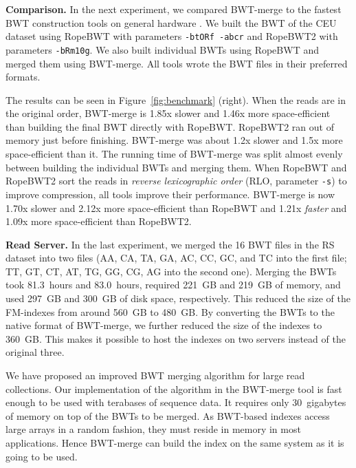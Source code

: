 \documentclass[smallabstract,smallcaptions]{dccpaper}
\newcommand{\BWT}{\textsf{BWT}}
\newcommand{\BWTmerge}{\textsf{BWT\nobreakdash-merge}}
\newcommand{\ropebwt}{\textsf{RopeBWT}}
\newcommand{\ropebwtii}{\textsf{RopeBWT2}}
\newcommand{\CEU}{\textsf{CEU}}
\newcommand{\RS}{\textsf{RS}}
\begin{document}
\smallbreak\noindent\textbf{Comparison.} In the next experiment, we compared \BWTmerge{} to the fastest \BWT{} construction tools on general hardware \cite{Li2014a}. We built the \BWT{} of the \CEU{} dataset using \ropebwt{} \cite{Li2011-2013} with parameters \texttt{-btORf -abcr} and \ropebwtii{} \cite{Li2014a} with parameters \texttt{-bRm10g}. We also built individual \BWT{}s using \ropebwt{} and merged them using \BWTmerge. All tools wrote the \BWT{} files in their preferred formats.

The results can be seen in Figure~\ref{fig:benchmark} (right). When the reads are in the original order, \BWTmerge{} is 1.85x slower and 1.46x more space-efficient than building the final \BWT{} directly with \ropebwt. \ropebwt2{} ran out of memory just before finishing. \BWTmerge{} was about 1.2x slower and 1.5x more space-efficient than it. The running time of \BWTmerge{} was split almost evenly between building the individual \BWT{}s and merging them.
%
When \ropebwt{} and \ropebwt2{} sort the reads in \emph{reverse lexicographic order} (RLO, parameter \texttt{-s}) to improve compression, all tools improve their performance. \BWTmerge{} is now 1.70x slower and 2.12x more space-efficient than \ropebwt{} and 1.21x \emph{faster} and 1.09x more space-efficient than \ropebwt2.

\smallbreak\noindent\textbf{Read Server.} In the last experiment, we merged the 16 \BWT{} files in the \RS{} dataset into two files (AA, CA, TA, GA, AC, CC, GC, and TC into the first file; TT, GT, CT, AT, TG, GG, CG, AG into the second one). Merging the \BWT{}s took 81.3~hours and 83.0~hours, required 221~GB and 219~GB of memory, and used 297~GB and 300~GB of disk space, respectively. This reduced the size of the FM-indexes from around 560~GB to 480~GB. By converting the \BWT{}s to the native format of \BWTmerge{}, we further reduced the size of the indexes to 360~GB. This makes it possible to host the indexes on two servers instead of the original three.



We have proposed an improved \BWT{} merging algorithm for large read collections. Our implementation of the algorithm in the \BWTmerge{} tool is fast enough to be used with terabases of sequence data. It requires only 30~gigabytes of memory on top of the \BWT{}s to be merged. As \BWT-based indexes access large arrays in a random fashion, they must reside in memory in most applications. Hence \BWTmerge{} can build the index on the same system as it is going to be used.
\end{document}
